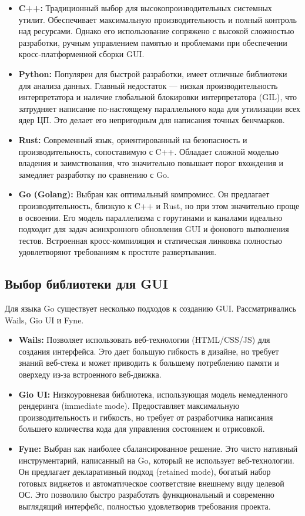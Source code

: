 \begin{itemize}
    \item \textbf{C++:} Традиционный выбор для высокопроизводительных системных утилит. Обеспечивает максимальную производительность и полный контроль над ресурсами. Однако его использование сопряжено с высокой сложностью разработки, ручным управлением памятью и проблемами при обеспечении кросс-платформенной сборки GUI.
    \item \textbf{Python:} Популярен для быстрой разработки, имеет отличные библиотеки для анализа данных. Главный недостаток — низкая производительность интерпретатора и наличие глобальной блокировки интерпретатора (GIL), что затрудняет написание по-настоящему параллельного кода для утилизации всех ядер ЦП. Это делает его непригодным для написания точных бенчмарков.
    \item \textbf{Rust:} Современный язык, ориентированный на безопасность и производительность, сопоставимую с C++. Обладает сложной моделью владения и заимствования, что значительно повышает порог вхождения и замедляет разработку по сравнению с Go.
    \item \textbf{Go (Golang):} Выбран как оптимальный компромисс. Он предлагает производительность, близкую к C++ и Rust, но при этом значительно проще в освоении. Его модель параллелизма с горутинами и каналами идеально подходит для задач асинхронного обновления GUI и фонового выполнения тестов. Встроенная кросс-компиляция и статическая линковка полностью удовлетворяют требованиям к простоте развертывания.
\end{itemize}

\subsection{Выбор библиотеки для GUI}

Для языка Go существует несколько подходов к созданию GUI. Рассматривались Wails, Gio UI и Fyne.

\begin{itemize}
    \item \textbf{Wails:} Позволяет использовать веб-технологии (HTML/CSS/JS) для создания интерфейса. Это дает большую гибкость в дизайне, но требует знаний веб-стека и может приводить к большему потреблению памяти и оверхеду из-за встроенного веб-движка.
    \item \textbf{Gio UI:} Низкоуровневая библиотека, использующая модель немедленного рендеринга (immediate mode). Предоставляет максимальную производительность и гибкость, но требует от разработчика написания большего количества кода для управления состоянием и отрисовкой.
    \item \textbf{Fyne:} Выбран как наиболее сбалансированное решение. Это чисто нативный инструментарий, написанный на Go, который не использует веб-технологии. Он предлагает декларативный подход (retained mode), богатый набор готовых виджетов и автоматическое соответствие внешнему виду целевой ОС. Это позволило быстро разработать функциональный и современно выглядящий интерфейс, полностью удовлетворив требования проекта.
\end{itemize}

